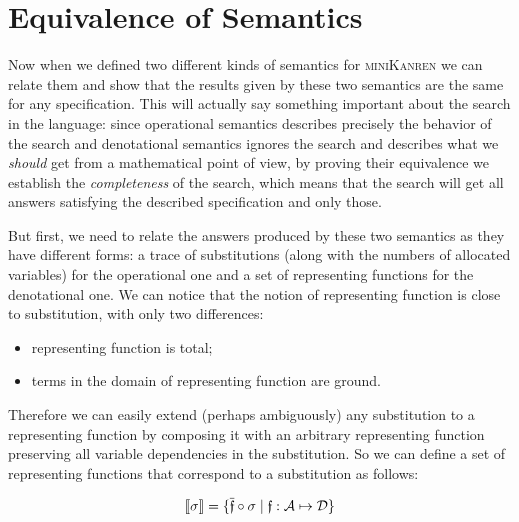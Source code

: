 \section{Equivalence of Semantics}
\label{equivalence}

Now when we defined two different kinds of semantics for \textsc{miniKanren} we can relate them and show that the results given by these two semantics are the same for any specification.
This will actually say something important about the search in the language: since operational semantics describes precisely the behavior of the search and denotational semantics
ignores the search and describes what we \emph{should} get from a mathematical point of view, by proving their equivalence we establish the \emph{completeness} of the search, which
means that the search will get all answers satisfying the described specification and only those.

But first, we need to relate the answers produced by these two semantics as they have different forms: a trace of substitutions (along with the numbers of allocated variables)
for the operational one and a set of representing functions for the denotational one. We can notice that the notion of representing function is close to substitution, with only two differences:

\begin{itemize}
\item representing function is total;
\item terms in the domain of representing function are ground.
\end{itemize}

Therefore we can easily extend (perhaps ambiguously) any substitution to a representing function by composing it with an arbitrary representing function preserving
all variable dependencies in the substitution. So we can define a set of representing functions that correspond to a substitution as follows:

\[
\llbracket{\sigma}\rrbracket = \{\overline{\mathfrak f} \circ \sigma \mid \mathfrak{f}:\mathcal{A}\mapsto\mathcal{D}\}
\]

\begin{comment}
In \textsc{Coq} this notion boils down to the following definition:

\begin{lstlisting}[language=Coq]
   Definition in_denotational_sem_subst
     (s : subst) (f : repr_fun) : Prop :=
       exists (f' : repr_fun),
         repr_fun_eq (subst_repr_fun_compose s f') f.
\end{lstlisting}

where ``\lstinline[language=Coq]|repr_fun_eq|'' stands for representing functions extensional equality, ``\lstinline[language=Coq]|subst_repr_fun_compose|''~---
for a composition of a substitution and a representing function.
\end{comment}

